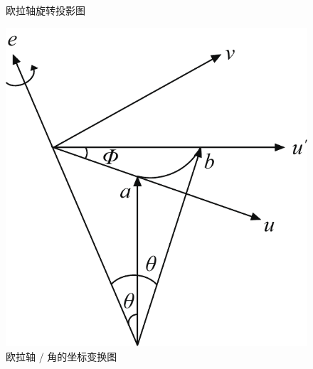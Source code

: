 \begin{figure}[!htb]
\begin{minipage}{0.348\linewidth}
		\caption{欧拉轴旋转投影图}
		\label{欧拉轴2}
	\end{minipage}
	\begin{minipage}{0.33\linewidth}
		\centering
		\includegraphics[width=0.913\linewidth]{pic/欧拉轴角}
		\caption{欧拉轴 / 角的坐标变换图}
		\label{欧拉轴角}
	\end{minipage}
\end{figure}

